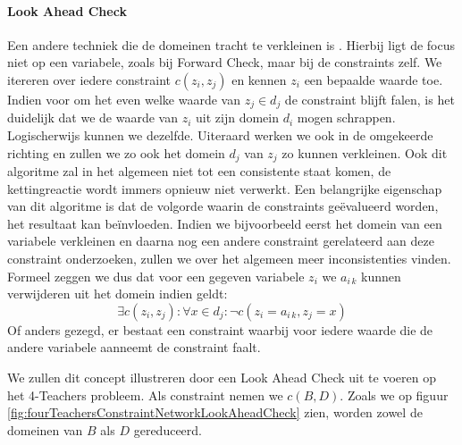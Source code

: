\paragraph{Look Ahead Check}
Een andere techniek die de domeinen tracht te verkleinen is . Hierbij ligt de focus niet op een variabele, zoals bij Forward Check, maar bij de constraints zelf. We itereren over iedere constraint $c\left(z_i,z_j\right)$ en kennen $z_i$ een bepaalde waarde toe. Indien voor om het even welke waarde van $z_j\in d_j$ de constraint blijft falen, is het duidelijk dat we de waarde van $z_i$ uit zijn domein $d_i$ mogen schrappen. Logischerwijs kunnen we dezelfde. Uiteraard werken we ook in de omgekeerde richting en zullen we zo ook het domein $d_j$ van $z_j$ zo kunnen verkleinen. Ook dit algoritme zal in het algemeen niet tot een consistente staat komen, de kettingreactie wordt immers opnieuw niet verwerkt. Een belangrijke eigenschap van dit algoritme is dat de volgorde waarin de constraints ge\"evalueerd worden, het resultaat kan be\"invloeden. Indien we bijvoorbeeld eerst het domein van een variabele verkleinen en daarna nog een andere constraint gerelateerd aan deze constraint onderzoeken, zullen we over het algemeen meer inconsistenties vinden. Formeel zeggen we dus dat voor een gegeven variabele $z_i$ we $a_{i\,k}$ kunnen verwijderen uit het domein indien geldt:
\begin{equation}
\exists c(z_i,z_j):\forall x\in d_j:\neg c\left(z_i=a_{i\,k},z_j=x\right)
\end{equation}
Of anders gezegd, er bestaat een constraint waarbij voor iedere waarde die de andere variabele aanneemt de constraint faalt.
\begin{leftbar}
We zullen dit concept illustreren door een Look Ahead Check uit te voeren op het 4-Teachers probleem. Als constraint nemen we $c\left(B,D\right)$. Zoals we op figuur \ref{fig:fourTeachersConstraintNetworkLookAheadCheck} zien, worden zowel de domeinen van $B$ als $D$ gereduceerd.
\end{leftbar}
